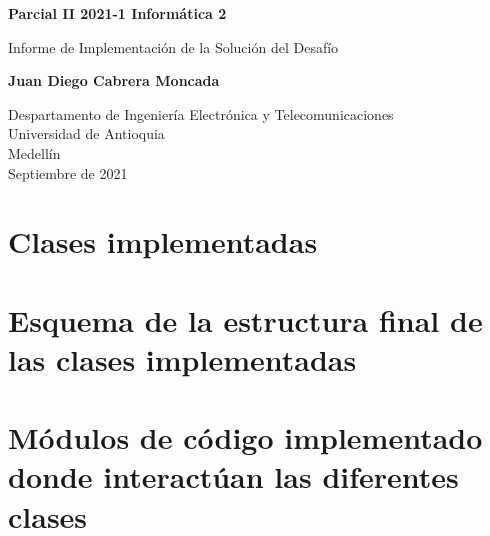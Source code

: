 \documentclass{article}
\begin{document}
\begin{titlepage}
    \begin{center}
        \vspace*{1cm}
            
        \Huge
        \textbf{Parcial II 2021-1 Informática 2}
            
        \vspace{0.5cm}
        \LARGE
        Informe de Implementación de la Solución del Desafío
            
        \vspace{1.5cm}
            
        \textbf{Juan Diego Cabrera Moncada}\\
            
        \vfill
            
        \vspace{0.8cm}
            
        \Large
        Despartamento de Ingeniería Electrónica y Telecomunicaciones\\
        Universidad de Antioquia\\
        Medellín\\
        Septiembre de 2021
            
    \end{center}
\end{titlepage}

\tableofcontents
\newpage
\section{Clases implementadas}
\section{Esquema de la estructura final de las clases implementadas}
\section{Módulos de código implementado donde interactúan las diferentes clases}
\end{document}

